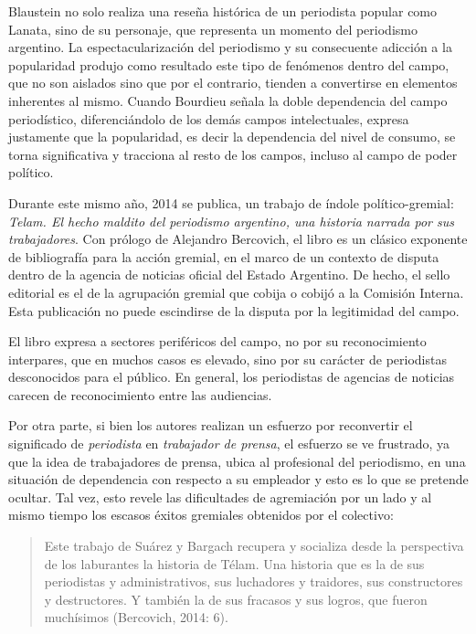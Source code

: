 {Blaustein no solo realiza una reseña histórica de un periodista popular como Lanata, sino de su personaje, que representa un momento del periodismo argentino. La espectacularización del periodismo y su consecuente adicción a la popularidad produjo como resultado este tipo de fenómenos dentro del campo, que no son aislados sino que por el contrario, tienden a convertirse en elementos inherentes al mismo. Cuando Bourdieu señala la doble dependencia del campo periodístico, diferenciándolo de los demás campos intelectuales, expresa justamente que la popularidad, es decir la dependencia del nivel de consumo, se torna significativa y tracciona al resto de los campos, incluso al campo de poder político.

Durante este mismo año, 2014 se publica, un trabajo de índole político-gremial: \emph{Telam. El hecho maldito del periodismo argentino, una historia narrada por sus trabajadores}. Con prólogo de Alejandro Bercovich, el libro es un clásico exponente de bibliografía para la acción gremial, en el marco de un contexto de disputa dentro de la agencia de noticias oficial del Estado Argentino. De hecho, el sello editorial es el de la agrupación gremial que cobija o cobijó a la Comisión Interna. Esta publicación no puede escindirse de la disputa por la legitimidad del campo.

El libro expresa a sectores periféricos del campo, no por su reconocimiento interpares, que en muchos casos es elevado, sino por su carácter de periodistas desconocidos para el público. En general, los periodistas de agencias de noticias carecen de reconocimiento entre las audiencias.

Por otra parte, si bien los autores realizan un esfuerzo por reconvertir el significado de \emph{periodista} en \emph{trabajador de prensa}, el esfuerzo se ve frustrado, ya que la idea de trabajadores de prensa, ubica al profesional del periodismo, en una situación de dependencia con respecto a su empleador y esto es lo que se pretende ocultar. Tal vez, esto revele las dificultades de agremiación por un lado y al mismo tiempo los escasos éxitos gremiales obtenidos por el colectivo:

\begin{quote}
Este trabajo de Suárez y Bargach recupera y socializa desde la perspectiva de los laburantes la historia de Télam. Una historia que es la de sus periodistas y administrativos, sus luchadores y traidores, sus constructores y destructores. Y también la de sus fracasos y sus logros, que fueron muchísimos (Bercovich, 2014: 6).
\end{quote}

}
